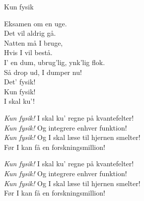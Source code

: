 \begin{song}{Kun fysik}
  \begin{SBVerse}
    Eksamen om en uge.\\
    Det vil aldrig gå.\\
    Natten må I bruge,\\
    Hvis I vil bestå.\\
    I' en dum, ubrug'lig, ynk'lig flok.\\
    Så drop ud, I dumper nu!\\
    Det' fysik!\\
    Kun fysik!\\
    I skal ku'!
  \end{SBVerse}

  \begin{SBChorus}
    \emph{Kun fysik!} I skal ku' regne på kvantefelter!\\
    \emph{Kun fysik!} Og integrere enhver funktion!\\
    \emph{Kun fysik!} Og I skal læse til hjernen smelter!\\
    Før I kan få en forskningsmillion!
  \end{SBChorus}

  \begin{SBChorus}
    \emph{Kun fysik!} I skal ku' regne på kvantefelter!\\
    \emph{Kun fysik!} Og integrere enhver funktion!\\
    \emph{Kun fysik!} Og I skal læse til hjernen smelter!\\
    Før I kan få en forskningsmillion!
  \end{SBChorus}


\end{song}